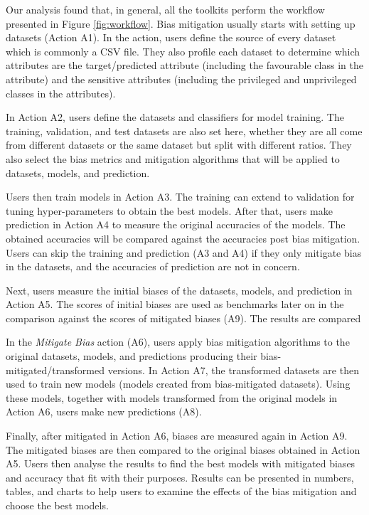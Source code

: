 \documentclass[final,5p,times,twocolumn]{elsarticle}
\begin{document}
Our analysis found that, in general, all the toolkits perform the workflow presented in Figure \ref{fig:workflow}. Bias mitigation usually starts with setting up datasets (Action A1). In the action, users define the source of every dataset which is commonly a CSV file. They also profile each dataset to determine which attributes are the target/predicted attribute (including the favourable class in the attribute) and the sensitive attributes (including the privileged and unprivileged classes in the attributes).

In Action A2, users define the datasets and classifiers for model training. The training, validation, and test datasets are also set here, whether they are all come from different datasets or the same dataset but split with different ratios. They also select the bias metrics and mitigation algorithms that will be applied to datasets, models, and prediction. 

Users then train models in Action A3. The training can extend to validation for tuning hyper-parameters to obtain the best models. After that, users make prediction in Action A4 to measure the original accuracies of the models. The obtained accuracies will be compared against the accuracies post bias mitigation.
Users can skip the training and prediction (A3 and A4) if they only mitigate bias in the datasets, and the accuracies of prediction are not in concern.

Next, users measure the initial biases of the datasets, models, and prediction in Action A5. The scores of initial biases are used as benchmarks later on in the comparison against the scores of mitigated biases (A9). The results are compared

In the \textit{Mitigate Bias} action (A6), users apply bias mitigation algorithms to the original datasets, models, and predictions producing their bias-mitigated/transformed versions. In Action A7, the transformed datasets are then used to train new models (models created from bias-mitigated datasets). Using these models, together with models transformed from the original models in Action A6, users make new predictions (A8). 

Finally, after mitigated in Action A6, biases are measured again in Action A9. The mitigated biases are then compared to the original biases obtained in Action A5.  Users then analyse the results to find the best models with mitigated biases and accuracy that fit with their purposes. Results can be presented in numbers, tables, and charts to help users to examine the effects of the bias mitigation and choose the best models. 
\end{document}
